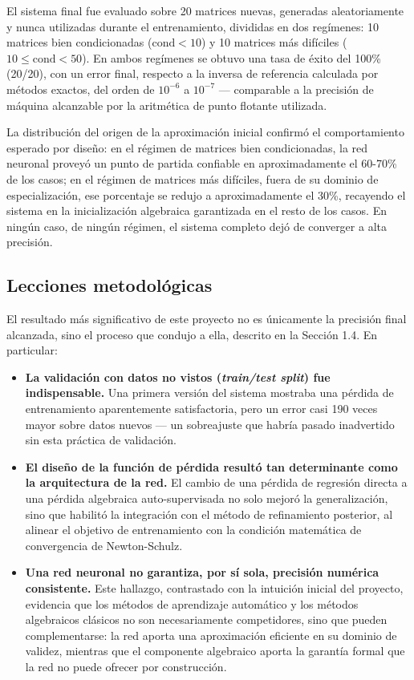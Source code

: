 \documentclass[12pt,a4paper]{article}
\begin{document}
El sistema final fue evaluado sobre 20 matrices nuevas, generadas aleatoriamente y nunca utilizadas durante el entrenamiento, divididas en dos regímenes: 10 matrices bien condicionadas ($\mathrm{cond} < 10$) y 10 matrices más difíciles ($10 \leq \mathrm{cond} < 50$). En ambos regímenes se obtuvo una tasa de éxito del 100\% (20/20), con un error final, respecto a la inversa de referencia calculada por métodos exactos, del orden de $10^{-6}$ a $10^{-7}$ --- comparable a la precisión de máquina alcanzable por la aritmética de punto flotante utilizada.

La distribución del origen de la aproximación inicial confirmó el comportamiento esperado por diseño: en el régimen de matrices bien condicionadas, la red neuronal proveyó un punto de partida confiable en aproximadamente el 60-70\% de los casos; en el régimen de matrices más difíciles, fuera de su dominio de especialización, ese porcentaje se redujo a aproximadamente el 30\%, recayendo el sistema en la inicialización algebraica garantizada en el resto de los casos. En ningún caso, de ningún régimen, el sistema completo dejó de converger a alta precisión.

\subsection{Lecciones metodológicas}

El resultado más significativo de este proyecto no es únicamente la precisión final alcanzada, sino el proceso que condujo a ella, descrito en la Sección 1.4. En particular:

\begin{itemize}
    \item \textbf{La validación con datos no vistos (\textit{train/test split}) fue indispensable.} Una primera versión del sistema mostraba una pérdida de entrenamiento aparentemente satisfactoria, pero un error casi 190 veces mayor sobre datos nuevos --- un sobreajuste que habría pasado inadvertido sin esta práctica de validación.

    \item \textbf{El diseño de la función de pérdida resultó tan determinante como la arquitectura de la red.} El cambio de una pérdida de regresión directa a una pérdida algebraica auto-supervisada no solo mejoró la generalización, sino que habilitó la integración con el método de refinamiento posterior, al alinear el objetivo de entrenamiento con la condición matemática de convergencia de Newton-Schulz.

    \item \textbf{Una red neuronal no garantiza, por sí sola, precisión numérica consistente.} Este hallazgo, contrastado con la intuición inicial del proyecto, evidencia que los métodos de aprendizaje automático y los métodos algebraicos clásicos no son necesariamente competidores, sino que pueden complementarse: la red aporta una aproximación eficiente en su dominio de validez, mientras que el componente algebraico aporta la garantía formal que la red no puede ofrecer por construcción.
\end{itemize}
\end{document}
